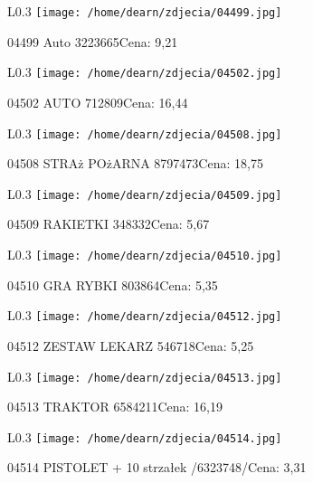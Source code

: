 \begin{wrapfigure}{L}{0.3\textwidth}
\texttt{[image: /home/dearn/zdjecia/04499.jpg]}
\end{wrapfigure}
04499 Auto 3223665Cena: 9,21\newline
\begin{wrapfigure}{L}{0.3\textwidth}
\texttt{[image: /home/dearn/zdjecia/04502.jpg]}
\end{wrapfigure}
04502 AUTO                                            712809Cena: 16,44\newline
\begin{wrapfigure}{L}{0.3\textwidth}
\texttt{[image: /home/dearn/zdjecia/04508.jpg]}
\end{wrapfigure}
04508 STRAż POżARNA                                  8797473Cena: 18,75\newline
\begin{wrapfigure}{L}{0.3\textwidth}
\texttt{[image: /home/dearn/zdjecia/04509.jpg]}
\end{wrapfigure}
04509 RAKIETKI                                        348332Cena: 5,67\newline
\begin{wrapfigure}{L}{0.3\textwidth}
\texttt{[image: /home/dearn/zdjecia/04510.jpg]}
\end{wrapfigure}
04510 GRA RYBKI                                      803864Cena: 5,35\newline
\begin{wrapfigure}{L}{0.3\textwidth}
\texttt{[image: /home/dearn/zdjecia/04512.jpg]}
\end{wrapfigure}
04512 ZESTAW LEKARZ                                  546718Cena: 5,25\newline
\begin{wrapfigure}{L}{0.3\textwidth}
\texttt{[image: /home/dearn/zdjecia/04513.jpg]}
\end{wrapfigure}
04513 TRAKTOR                                        6584211Cena: 16,19\newline
\begin{wrapfigure}{L}{0.3\textwidth}
\texttt{[image: /home/dearn/zdjecia/04514.jpg]}
\end{wrapfigure}
04514 PISTOLET + 10 strzałek /6323748/Cena: 3,31\newline
